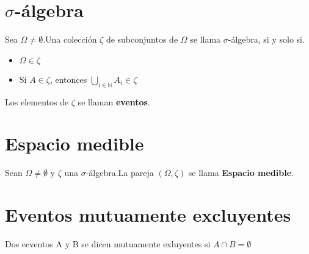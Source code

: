 \documentclass{book}
\begin{document}
    \section{$\sigma$-álgebra}
    Sea $\Omega \not = \emptyset $.Una colección $\zeta$ de subconjuntos de $\Omega$ se llama $\sigma$-álgebra, si y solo si.
    \begin{itemize}
        \item $\Omega \in \zeta$
        \item Si $A \in \zeta$, entonces $\displaystyle\bigcup_{i \in \mathbb{N}}{A_{i} \in \zeta }$
    \end{itemize}
    Los elementos de $\zeta$ se llaman \textbf{eventos}.
    \section{Espacio medible}
    Sean $\Omega \not = \emptyset $ y  $\zeta$ una $\sigma$-álgebra.La pareja 
    $( \Omega, \zeta )$ se llama \textbf{Espacio medible}.
    \section{Eventos mutuamente excluyentes}
    Dos eeventos A y B se dicen mutuamente exluyentes si $A \cap B = \emptyset$ 
\end{document}
